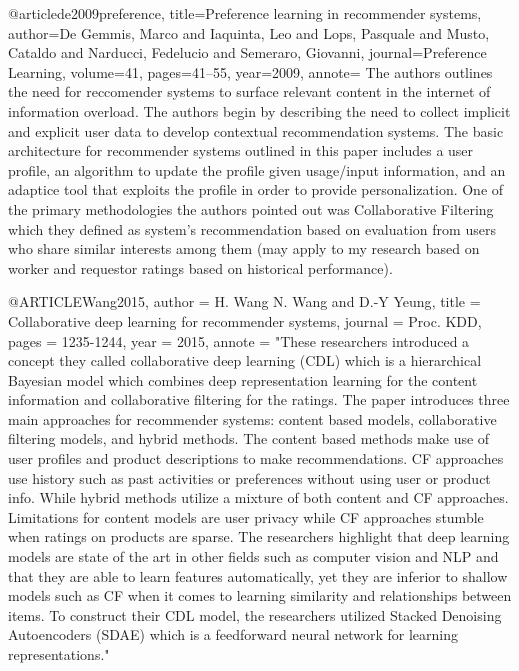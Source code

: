 @article{de2009preference,
  title={Preference learning in recommender systems},
  author={De Gemmis, Marco and Iaquinta, Leo and Lops, Pasquale and Musto, Cataldo and Narducci, Fedelucio and Semeraro, Giovanni},
  journal={Preference Learning},
  volume={41},
  pages={41--55},
  year={2009},
  annote={
    The authors outlines the need for reccomender systems to surface relevant content in the internet of information overload. The authors begin by describing the need to collect implicit and explicit user data to develop contextual
    recommendation systems. The basic architecture for recommender systems outlined in this paper includes a user profile, an algorithm to update the profile given usage/input information, and an adaptice tool that exploits the profile
    in order to provide personalization. One of the primary methodologies the authors pointed out was Collaborative Filtering which they defined as system's recommendation based on evaluation from users who share similar interests among
    them (may apply to my research based on worker and requestor ratings based on historical performance).
  }
}

@ARTICLE{Wang2015,
  author = {H. Wang N. Wang and D.-Y Yeung},
  title = {Collaborative deep learning for recommender systems},
  journal = {Proc. KDD},
  pages = {1235-1244},
  year = {2015},
  annote = "These researchers introduced a concept they called collaborative deep learning (CDL) which is a hierarchical Bayesian model which combines deep representation learning for the content
  information and collaborative filtering for the ratings. The paper introduces three main approaches for recommender systems: content based models, collaborative filtering models, and hybrid methods.
  The content based methods make use of user profiles and product descriptions to make recommendations. CF approaches use history such as past activities or preferences without using user or product info. While
  hybrid methods utilize a mixture of both content and CF approaches. Limitations for content models are user privacy while CF approaches stumble when ratings on products are sparse. The researchers highlight that deep
  learning models are state of the art in other fields such as computer vision and NLP and that they are able to learn features automatically, yet they are inferior to shallow models such as CF when it comes to learning similarity and
  relationships between items. To construct their CDL model, the researchers utilized Stacked Denoising Autoencoders (SDAE) which is a feedforward  neural network for learning representations."
}

